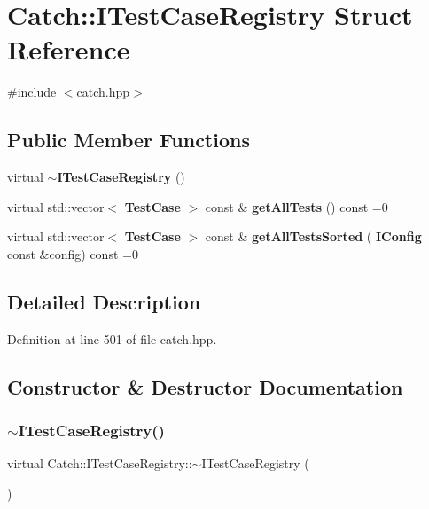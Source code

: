 \section{Catch\+::I\+Test\+Case\+Registry Struct Reference}
\label{struct_catch_1_1_i_test_case_registry}


{\ttfamily \#include $<$catch.\+hpp$>$}

\subsection*{Public Member Functions}
\begin{DoxyCompactItemize}
\item 
virtual \textbf{ $\sim$\+I\+Test\+Case\+Registry} ()
\item 
virtual std\+::vector$<$ \textbf{ Test\+Case} $>$ const  \& \textbf{ get\+All\+Tests} () const =0
\item 
virtual std\+::vector$<$ \textbf{ Test\+Case} $>$ const  \& \textbf{ get\+All\+Tests\+Sorted} (\textbf{ I\+Config} const \&config) const =0
\end{DoxyCompactItemize}


\subsection{Detailed Description}


Definition at line 501 of file catch.\+hpp.



\subsection{Constructor \& Destructor Documentation}
\mbox{\label{struct_catch_1_1_i_test_case_registry_ae14798f05ac8e2b18cff532849a4da81}} 
\subsubsection{$\sim$ITestCaseRegistry()}
{\footnotesize\ttfamily virtual Catch\+::\+I\+Test\+Case\+Registry\+::$\sim$\+I\+Test\+Case\+Registry (\begin{DoxyParamCaption}{ }\end{DoxyParamCaption})\hspace{0.3cm}{\ttfamily [virtual]}}



